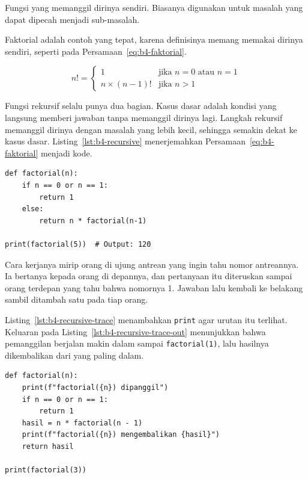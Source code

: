 Fungsi yang memanggil dirinya sendiri. Biasanya digunakan untuk masalah yang dapat dipecah menjadi sub-masalah.

Faktorial adalah contoh yang tepat, karena definisinya memang memakai dirinya sendiri, seperti pada Persamaan~\eqref{eq:b4-faktorial}.

\begin{equation}
  n! =
  \begin{cases}
    1 & \text{jika } n = 0 \text{ atau } n = 1 \\
    n \times (n-1)! & \text{jika } n > 1
  \end{cases}
  \label{eq:b4-faktorial}
\end{equation}

Fungsi rekursif selalu punya dua bagian. Kasus dasar adalah kondisi yang langsung memberi jawaban tanpa memanggil dirinya lagi. Langkah rekursif memanggil dirinya dengan masalah yang lebih kecil, sehingga semakin dekat ke kasus dasar. Listing~\ref{lst:b4-recursive} menerjemahkan Persamaan~\eqref{eq:b4-faktorial} menjadi kode.

\begin{lstlisting}[style=PythonStyle, caption={Kode Python: recursive_function.py}, label={lst:b4-recursive}]
def factorial(n):
    if n == 0 or n == 1:
        return 1
    else:
        return n * factorial(n-1)

print(factorial(5))  # Output: 120
\end{lstlisting}

Cara kerjanya mirip orang di ujung antrean yang ingin tahu nomor antreannya. Ia bertanya kepada orang di depannya, dan pertanyaan itu diteruskan sampai orang terdepan yang tahu bahwa nomornya 1. Jawaban lalu kembali ke belakang sambil ditambah satu pada tiap orang.

Listing~\ref{lst:b4-recursive-trace} menambahkan \texttt{print} agar urutan itu terlihat. Keluaran pada Listing~\ref{lst:b4-recursive-trace-out} menunjukkan bahwa pemanggilan berjalan makin dalam sampai \texttt{factorial(1)}, lalu hasilnya dikembalikan dari yang paling dalam.

\begin{lstlisting}[style=PythonStyle, caption={Kode Python: recursive_trace.py}, label={lst:b4-recursive-trace}]
def factorial(n):
    print(f"factorial({n}) dipanggil")
    if n == 0 or n == 1:
        return 1
    hasil = n * factorial(n - 1)
    print(f"factorial({n}) mengembalikan {hasil}")
    return hasil

print(factorial(3))
\end{lstlisting}

